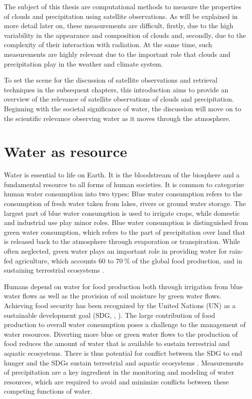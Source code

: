 The subject of this thesis are computational methods to measure the properties
of clouds and precipitation using satellite observations. As will be explained
in more detail later on, these measurements are difficult, firstly, due to the
high variability in the appearance and composition of clouds and, secondly, due
to the complexity of their interaction with radiation. At the same time, such
measurements are highly relevant due to the important role that clouds and
precipitation play in the weather and climate system.

To set the scene for the discussion of satellite observations and retrieval
techniques in the subsequent chapters, this introduction aims to provide an
overview of the relevance of satellite observations of clouds and precipitation.
Beginning with the societal significance of water, the discussion will move on
to the scientific relevance observing water as it moves through the atmosphere.

\section{Water as resource}

Water is essential to life on Earth. It is the bloodstream of the biosphere
\citep{falkenmark04} and a fundamental resource to all forms of human
societies. It is common to categorize human water consumption into two types:
Blue water consumption refers to the consumption of fresh water taken from lakes,
rivers or ground water storage. The largest part of blue water consumption is
used to irrigate crops, while domestic and industrial use play minor roles. Blue
water consumption is distinguished from green water consumption, which refers to
the part of  precipitation over land that is released back to the atmosphere
through evaporation or transpiration. While often neglected, green water plays
an important role in providing water for rain-fed agriculture, which accounts
$60$ to $\SI{70}{\percent}$ of the global food production, and in sustaining
terrestrial ecosystems \citep{falkenmark04}.

Humans depend on water for food production both through irrigation from blue
water flows as well as the provision of soil moisture by green water flows.
Achieving food security has been recognized by the United Nations (UN) as a
sustainable development goal (SDG, \citeauthor{sdg}, \citeyear{sdg}). The large
contribution of food production to overall water consumption poses a challenge
to the management of water resources. Diverting more blue or green water flows
to the production of food reduces the amount of water that is available to
sustain terrestrial and aquatic ecosystems. There is thus potential for conflict
between the SDG to end hunger and the SDGs sustain terrestrial and aquatic
ecosystems \citep{falkenmark04}. Measurements of precipitation are a key
ingredient in the monitoring and modeling of water resources, which are required
to avoid and minimize conflicts between these competing functions of water.

